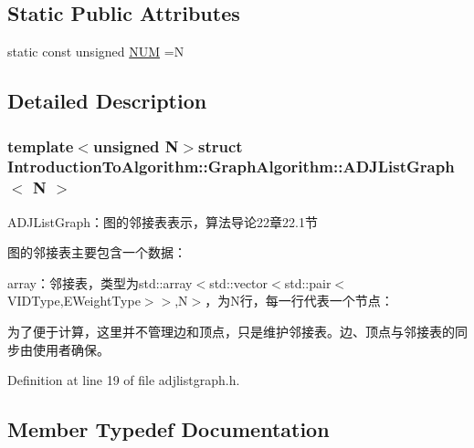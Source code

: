 \subsection*{Static Public Attributes}
\begin{DoxyCompactItemize}
\item 
static const unsigned \hyperlink{struct_introduction_to_algorithm_1_1_graph_algorithm_1_1_a_d_j_list_graph_aaff3f1cdb9f184027dd3f057d4a5b4bc}{N\+U\+M} =N
\end{DoxyCompactItemize}


\subsection{Detailed Description}
\subsubsection*{template$<$unsigned N$>$struct Introduction\+To\+Algorithm\+::\+Graph\+Algorithm\+::\+A\+D\+J\+List\+Graph$<$ N $>$}

A\+D\+J\+List\+Graph：图的邻接表表示，算法导论22章22.1节 

图的邻接表主要包含一个数据：


\begin{DoxyItemize}
\item {\ttfamily array}：邻接表，类型为{\ttfamily std\+::array$<$std\+::vector$<$std\+::pair$<$V\+I\+D\+Type,E\+Weight\+Type$>$$>$,N$>$}，为{\ttfamily N}行，每一行代表一个节点：
\end{DoxyItemize}

为了便于计算，这里并不管理边和顶点，只是维护邻接表。边、顶点与邻接表的同步由使用者确保。 

Definition at line 19 of file adjlistgraph.\+h.



\subsection{Member Typedef Documentation}
\hypertarget{struct_introduction_to_algorithm_1_1_graph_algorithm_1_1_a_d_j_list_graph_a6757574602df8359b10e37079c789eb6}{}
